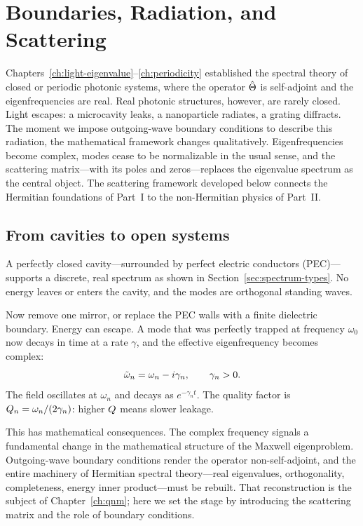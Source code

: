 \chapter{Boundaries, Radiation, and Scattering}
\label{ch:boundaries}

\begin{chapterlead}
Chapters~\ref{ch:light-eigenvalue}--\ref{ch:periodicity} established the
spectral theory of closed or periodic photonic systems, where the
operator $\hat{\Theta}$ is self-adjoint and the eigenfrequencies are real.
Real photonic structures, however, are rarely closed. Light escapes:
a microcavity leaks, a nanoparticle radiates, a grating diffracts.
The moment we impose outgoing-wave boundary conditions to describe this
radiation, the mathematical framework changes qualitatively.
Eigenfrequencies become complex, modes cease to be normalizable in the
usual sense, and the scattering matrix---with its poles and
zeros---replaces the eigenvalue spectrum as the central object.
The scattering framework developed below connects the Hermitian
foundations of Part~I to the non-Hermitian physics of Part~II.
\end{chapterlead}


\section{From cavities to open systems}
\label{sec:open-systems}

A perfectly closed cavity---surrounded by perfect electric conductors
(PEC)---supports a discrete, real spectrum as shown in
Section~\ref{sec:spectrum-types}. No energy leaves or enters the cavity,
and the modes are orthogonal standing waves.

Now remove one mirror, or replace the PEC walls with a finite dielectric
boundary. Energy can escape. A mode that was perfectly trapped at
frequency $\omega_0$ now decays in time at a rate $\gamma$, and the
effective eigenfrequency becomes complex:
\begin{equation}
 \tilde{\omega}_n = \omega_n - i\gamma_n, \qquad \gamma_n > 0.
 \label{eq:complex-freq}
\end{equation}
The field oscillates at $\omega_n$ and decays as $e^{-\gamma_n t}$.
The quality factor is $Q_n = \omega_n / (2\gamma_n)$: higher $Q$
means slower leakage.

This has mathematical consequences. The complex frequency
signals a fundamental change in the mathematical structure of the
Maxwell eigenproblem. Outgoing-wave boundary conditions render the
operator non-self-adjoint, and the entire machinery of Hermitian spectral
theory---real eigenvalues, orthogonality, completeness, energy inner
product---must be rebuilt. That reconstruction is the subject of
Chapter~\ref{ch:qnm}; here we set the stage by introducing the
scattering matrix and the role of boundary conditions.

